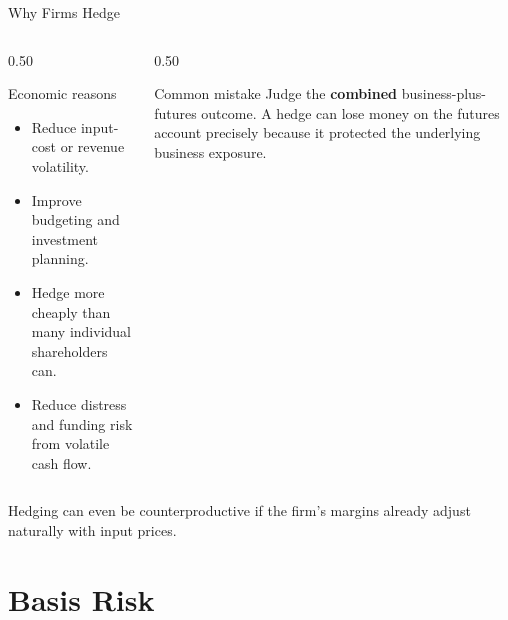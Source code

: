 \documentclass[aspectratio=169,11pt]{beamer}
\begin{document}
\begin{frame}{Why Firms Hedge}
    \begin{columns}[T]
        \begin{column}{0.50\textwidth}
            \begin{block}{Economic reasons}
                \begin{itemize}
                    \item Reduce input-cost or revenue volatility.
                    \item Improve budgeting and investment planning.
                    \item Hedge more cheaply than many individual shareholders can.
                    \item Reduce distress and funding risk from volatile cash flow.
                \end{itemize}
            \end{block}
        \end{column}
        \begin{column}{0.50\textwidth}
            \begin{alertblock}{Common mistake}
                Judge the \textbf{combined} business-plus-futures outcome.
                A hedge can lose money on the futures account precisely because it protected the underlying business exposure.
            \end{alertblock}
        \end{column}
    \end{columns}

    \vspace{0.4em}
    Hedging can even be counterproductive if the firm's margins already adjust naturally with input prices.
\end{frame}

\section{Basis Risk}
\end{document}
